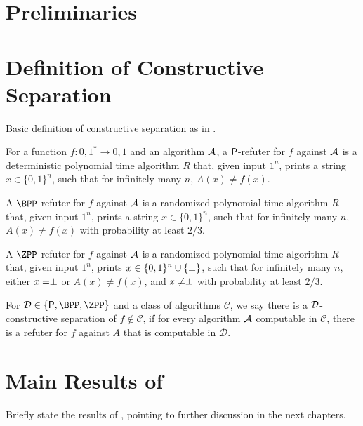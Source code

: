 
\section{Preliminaries}

\section{Definition of Constructive Separation}

Basic definition of constructive separation as in \cite{ConstructiveSeparations}.

\begin{definition}
	\label{def:refuter}
	For a function $f \colon {0, 1}^* \to {0, 1}$ and an algorithm $\mathcal{A}$, 
	a $\mathsf{P}$-refuter for $f$ against $\mathcal{A}$ is a deterministic polynomial time
	algorithm $R$ that, given input $1^n$, prints a string $x \in \{0, 1\}^n$,
	such that for infinitely many $n$, $A(x) \neq f(x)$.
	
	A $\BPP$-refuter for $f$ against $\mathcal{A}$ is a randomized polynomial time algorithm
	$R$ that, given input $1^n$, prints a string $x \in \{0, 1\}^n$, such that 
	for infinitely many $n$, $A(x) \neq f(x)$ with probability at least $2/3$.

	A $\ZPP$-refuter for $f$ against $\mathcal{A}$ is a randomized polynomial time algorithm $R$
	that, given input $1^n$, prints $x \in \{0, 1\}^n \cup \{\perp\}$, such that for 
	infinitely many $n$, either $x = \perp$ or $A(x) \neq f(x)$, and $x \neq \perp$ with
	probability at least $2/3$. 
\end{definition}

\begin{definition}
	\label{def:constructiveseparation}
	For $\calD \in \{\PTIME, \BPP, \ZPP\}$ and a class of algorithms $\mathcal{C}$, we say there is a 
	$\mathcal{D}$-constructive separation of $f \not\in \mathcal{C}$, if for every algorithm $\mathcal{A}$ computable
	in $\mathcal{C}$, there is a refuter for $f$ against $A$ that is computable in $\mathcal{D}$. 
\end{definition}

\section{Main Results of \cite{ConstructiveSeparations}}

Briefly state the results of \cite{ConstructiveSeparations}, pointing to further discussion in the next chapters. 

